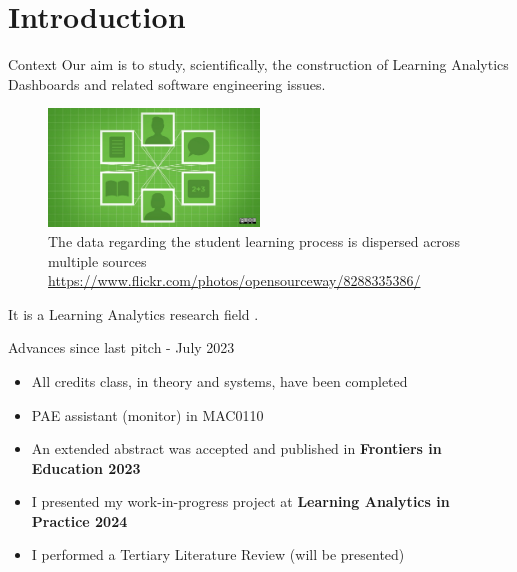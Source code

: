 \section{Introduction}

\begin{frame}{Context}
    Our aim is to study, scientifically, the construction of Learning Analytics Dashboards and related software engineering issues.

    \begin{figure}[H]
        \centering
        \label{fig:digital_learning}
        \includegraphics[width=0.5\textwidth]{../../images/digital_learning.jpg}
        \\ \small The data regarding the student learning process is dispersed across multiple sources
        \\ \small \url{https://www.flickr.com/photos/opensourceway/8288335386/}
    \end{figure}

    It is a Learning Analytics research field \cite{lang2017handbook}.
\end{frame}

\begin{frame}{Advances since last pitch - July 2023}
    \begin{itemize}[<alert@+>]\color{gray}
        \item All credits class, in theory and systems, have been completed
        \item PAE assistant (monitor) in MAC0110 
        \item An extended abstract was accepted and published in \textbf{Frontiers in Education 2023}
        \item I presented my work-in-progress project at \textbf{Learning Analytics in Practice 2024}
        \item I performed a Tertiary Literature Review (will be presented)
    \end{itemize}
\end{frame}


